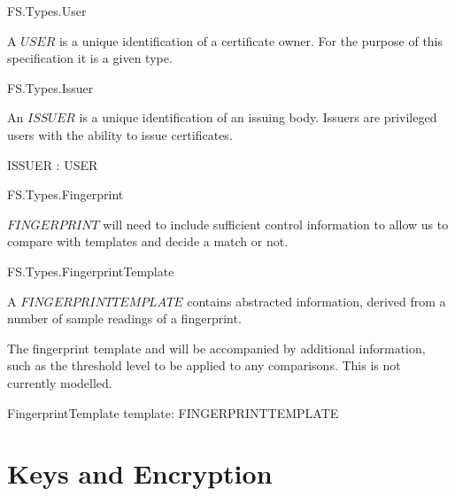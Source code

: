 \begin{traceunit}{FS.Types.User}
\end{traceunit}


A $USER$ is a unique identification of a certificate owner. For the
purpose of this specification it is a given type. 
 
\begin{zed}
	[ USER ]
\end{zed}

\begin{traceunit}{FS.Types.Issuer}
\end{traceunit}


An $ISSUER$ is a unique identification of an issuing body. Issuers are
privileged users with the ability to issue certificates. 
 
\begin{axdef}
ISSUER : \power USER
\end{axdef}

\begin{traceunit}{FS.Types.Fingerprint}
\end{traceunit}


$FINGERPRINT$ will need to include sufficient control information to allow
us to compare with templates and decide a match or not.
\begin{zed}
	[ FINGERPRINT ]
\end{zed}

\begin{traceunit}{FS.Types.FingerprintTemplate}
\end{traceunit}


A $FINGERPRINTTEMPLATE$ contains abstracted information, derived from
a number of sample readings of a fingerprint.

\begin{zed}
	[ FINGERPRINTTEMPLATE ]
\end{zed}

The fingerprint template and will be accompanied by additional information,
such as the threshold level to be applied to any comparisons.
This is not currently modelled.
\begin{schema}{FingerprintTemplate}
	template: FINGERPRINTTEMPLATE
\end{schema}


\section{Keys and Encryption}

